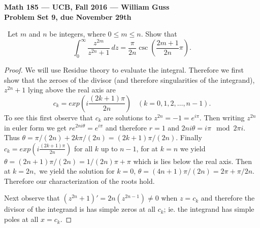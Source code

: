 \documentclass[11pt]{amsart}
\theoremstyle{definition}
\numberwithin{theorem}{section}
\numberwithin{definition}{section}
\numberwithin{equation}{section}
\newcommand{\parens}[1]{ \left( #1 \right) }
\begin{document}
\begin{center}{\bf Math 185 --- UCB, Fall 2016 --- William Guss}
\\
{\bf Problem Set 9, due November 29th}
\end{center}
\medskip {}\ Let $m$ and $n$ be integers, where $0 \leq m \leq n$. Show that
\begin{equation*}
	\int_0^\infty \frac{z^{2m}}{z^{2n}+1}\ dz= \frac{\pi}{2n} \csc \parens{\frac{2m + 1}{2n} \pi}.
\end{equation*}
\begin{proof}
	We will use Residue theory to evaluate the integral. Therefore we first show that the zeroes of the divisor (and therefore singularities of the integrand), $z^{2n}+1$ lying above the real axis are
	\begin{equation*}
		c_k = exp\parens{i\frac{(2k+1)\pi}{2n}}\;\;\;(k = 0, 1, 2, \dots, n-1).
	\end{equation*}
	To see this first observe that $c_k$ are solutions to $z^{2n} = -1 = e^{i\pi}.$ Then writing
	$z^{2n}$ in euler form we get $re^{2ni\theta} = e^{i\pi}$ and therefore $r = 1$ and 
	$2n i \theta = i \pi \mod 2\pi i$. Thus $\theta = \pi/(2n) + 2k\pi/(2n) = (2k +1)\pi/(2n).$
	Finally $c_k = exp\parens{i \frac{(2k+1)\pi}{2n}}$ for all $k$ up to $n-1$, for at $k = n$ we 
	yield $\theta = (2n +1)\pi/(2n) = 1/(2n) \pi + \pi$ which is lies below the real axis.
	Then at $k = 2n,$ we yield the solution for $k =0$, $\theta = (4n+1)\pi/(2n) = 2\pi + \pi/2n$.
	Therefore our characterization of the roots hold.


	Next observe that $(z^{2n} +1)' = 2n(z^{2n -1}) \neq 0$ when $z = c_k$ and therefore the divisor of the integrand
	is has simple zeros at all $c_k$; ie. the integrand has simple poles at all $x = c_k.$


\end{proof}
\end{document}
